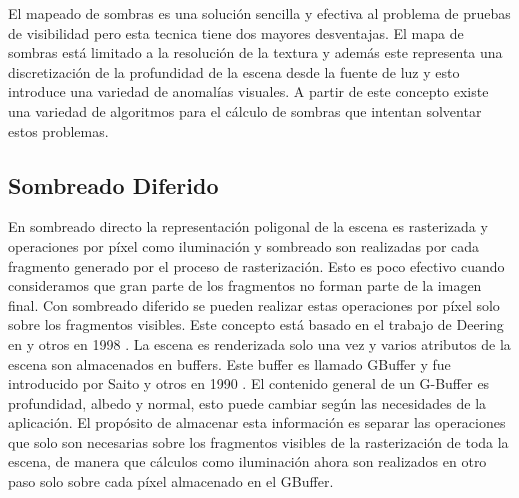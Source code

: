 El mapeado de sombras es una solución sencilla y efectiva al problema de pruebas de visibilidad pero esta tecnica tiene dos mayores desventajas. El mapa de sombras está limitado a la resolución de la textura y además este representa una discretización de la profundidad de la escena desde la fuente de luz y esto introduce una variedad de anomalías visuales. A partir de este concepto existe una variedad de algoritmos para el cálculo de sombras que intentan solventar estos problemas.

\subsection{Sombreado Diferido}
\label{sub:deferred_rendering_theory}
En sombreado directo la representación poligonal de la escena es rasterizada y operaciones por píxel como iluminación y sombreado son realizadas por cada fragmento generado por el proceso de rasterización. Esto es poco efectivo cuando consideramos que gran parte de los fragmentos no forman parte de la imagen final.
Con sombreado diferido se pueden realizar estas operaciones por píxel solo sobre los fragmentos visibles. Este concepto está basado en el trabajo de Deering en y otros en 1998 \cite{Deering:1988}. La escena es renderizada solo una vez y varios atributos de la escena son almacenados en buffers. Este buffer es llamado \ac{GBuffer} y fue introducido por Saito y otros en 1990 \cite{Saito:1990}. El contenido general de un G-Buffer es profundidad, albedo y normal, esto puede cambiar según las necesidades de la aplicación. El propósito de almacenar esta información es separar las operaciones que solo son necesarias sobre los fragmentos visibles de la rasterización de toda la escena, de manera que cálculos como iluminación ahora son realizados en otro paso solo sobre cada píxel almacenado en el \ac{GBuffer}.

